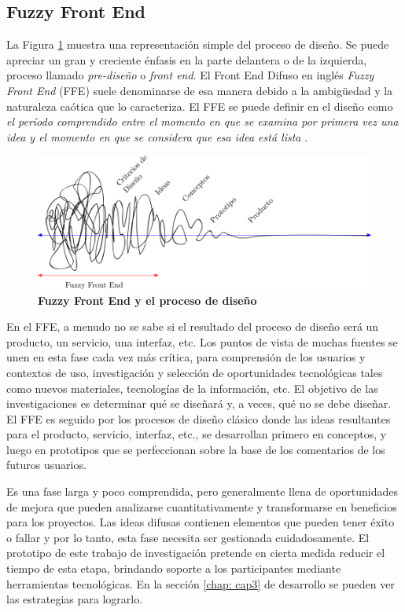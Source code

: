 \subsection{Fuzzy Front End}
La Figura \ref{fig:fuzzy1} muestra una representación simple del proceso de diseño. Se puede apreciar un gran y creciente énfasis en la parte delantera o de la izquierda, proceso llamado \textit{pre-diseño} o \textit{front end}.
El Front End Difuso en inglés  \textit{Fuzzy Front End} (FFE) suele denominarse de esa manera debido a la ambigüedad y la naturaleza caótica que lo caracteriza. El FFE se puede definir en el diseño como \textit{el período comprendido entre el momento en que se examina por primera vez una idea y el momento en que se considera que esa idea está lista} \citep{schreiner}.

\begin{figure}
\centering
\includegraphics[width=14cm]{Img/CPD/cpd-fuzzy.png}
\caption{\textbf{\footnotesize{Fuzzy Front End y el proceso de diseño}}}
\label{fig:fuzzy1}
\end{figure}


En el FFE, a menudo no se sabe si el resultado del proceso de diseño será un producto, un servicio, una interfaz, etc. Los puntos de vista de muchas fuentes se unen en esta fase cada vez más crítica, para comprensión de los usuarios y contextos de uso, investigación y selección de oportunidades tecnológicas tales como nuevos materiales, tecnologías de la información, etc. El objetivo de las investigaciones es determinar qué se diseñará y, a veces, qué no se debe diseñar. El FFE es seguido por los procesos de diseño clásico donde las ideas resultantes para el producto, servicio, interfaz, etc., se desarrollan primero en conceptos, y luego en prototipos que se perfeccionan sobre la base de los comentarios de los futuros usuarios.

Es una fase larga y poco comprendida, pero generalmente llena de oportunidades de mejora que pueden analizarse cuantitativamente y transformarse en beneficios para los proyectos. Las ideas difusas contienen elementos que pueden tener éxito o fallar y por lo tanto, esta fase necesita ser gestionada cuidadosamente. El prototipo de este trabajo de investigación pretende en cierta medida reducir el tiempo de esta etapa, brindando soporte a los participantes mediante herramientas tecnológicas. En la sección \ref{chap: cap3} de desarrollo se pueden ver las estrategias para lograrlo.

